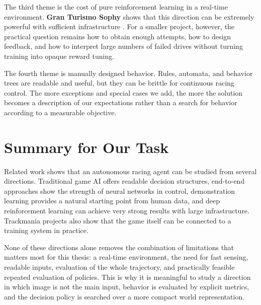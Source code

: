 The third theme is the cost of pure reinforcement learning in a real-time environment. \textbf{Gran Turismo Sophy} shows that this direction can be extremely powerful with sufficient infrastructure \cite{wurman2022gt_sophy}. For a smaller project, however, the practical question remains how to obtain enough attempts, how to design feedback, and how to interpret large numbers of failed drives without turning training into opaque reward tuning.

The fourth theme is manually designed behavior. Rules, automata, and behavior trees are readable and useful, but they can be brittle for continuous racing control. The more exceptions and special cases we add, the more the solution becomes a description of our expectations rather than a search for behavior according to a measurable objective.

\section{Summary for Our Task}

Related work shows that an autonomous racing agent can be studied from several directions. Traditional game AI offers readable decision structures, end-to-end approaches show the strength of neural networks in control, demonstration learning provides a natural starting point from human data, and deep reinforcement learning can achieve very strong results with large infrastructure. Trackmania projects also show that the game itself can be connected to a training system in practice.

None of these directions alone removes the combination of limitations that matters most for this thesis: a real-time environment, the need for fast sensing, readable inputs, evaluation of the whole trajectory, and practically feasible repeated evaluation of policies. This is why it is meaningful to study a direction in which image is not the main input, behavior is evaluated by explicit metrics, and the decision policy is searched over a more compact world representation.
